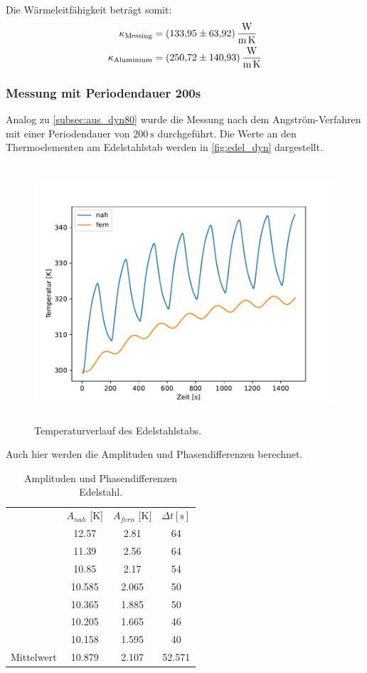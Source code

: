 \noindent Die Wärmeleitfähigkeit beträgt somit:
\begin{align*}
  \kappa_{\text{Messing}}&=\qty{133.95 +- 63.92}{\watt\per\meter\per\kelvin}\\
  \kappa_{\text{Aluminium}}&=\qty{250.72 +- 140.93}{\watt\per\meter\per\kelvin}
\end{align*}

\subsubsection{Messung mit Periodendauer 200s}
\label{subsubsec:aus_dyn200}

Analog zu \autoref{subsec:aus_dyn80} wurde die Messung nach dem Angström-Verfahren mit einer Periodendauer von $\qty{200}{\second}$ durchgeführt.
Die Werte an den Thermoelementen am Edelstahlstab werden in \autoref{fig:edel_dyn} dargestellt.

\begin{figure}[H]
  \centering
  \includegraphics[height=9.5cm]{content/dyn_2.pdf}
  \caption{Temperaturverlauf des Edelstahlstabs.}
  \label{fig:edel_dyn}
\end{figure}

Auch hier werden die Amplituden und Phasendifferenzen berechnet.
\begin{table}[H]
	\centering
	\caption{Amplituden und Phasendifferenzen Edelstahl.}
	\label{tab:AuPE}
	\begin{tabular}{l S S S[table-format=2.0]}
		\toprule
		&{$A_{nah}$ [K]} & {$A_{fern}$ [K]} &{$\Delta t [\si{\second}]$}\\
		\cmidrule(lr) {2-4}
		& 12.57 & 2.81& 64 \\
    & 11.39& 2.56 & 64\\
    &10.85& 2.17 & 54\\
    & 10.585 & 2.065 & 50 \\
    & 10.365& 1.885& 50\\
    & 10.205& 1.665& 46\\
    & 10.158& 1.595 & 40\\
    \cmidrule(lr) {2-4}
    {Mittelwert}&10.879&2.107 &52.571 \\
		\bottomrule
	\end{tabular}
\end{table}	

